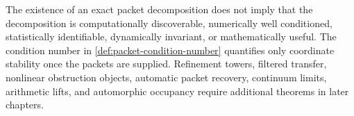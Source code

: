\begin{boundary}
\label{bnd:final-claim-boundary}
The existence of an exact packet decomposition does not imply that the decomposition is computationally discoverable, numerically well conditioned, statistically identifiable, dynamically invariant, or mathematically useful.  The condition number in \cref{def:packet-condition-number} quantifies only coordinate stability once the packets are supplied.  Refinement towers, filtered transfer, nonlinear obstruction objects, automatic packet recovery, continuum limits, arithmetic lifts, and automorphic occupancy require additional theorems in later chapters.
\end{boundary}



